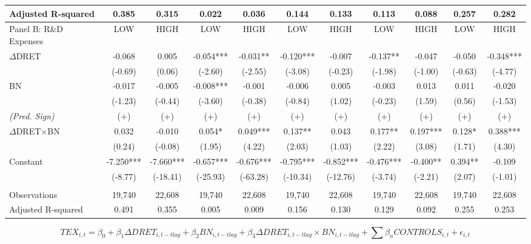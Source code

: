 \begin{table}[H]
\begin{center}
\begin{tabular}{lcccccccccc}
			Adjusted R-squared & 0.385 & 0.315 & 0.022 & 0.036 & 0.144 & 0.133 & 0.113 & 0.088 & 0.257 & 0.282 \\
			\midrule
			Panel B: R\&D Expenses & LOW & HIGH & LOW & HIGH & LOW & HIGH & LOW & HIGH & LOW & HIGH\\
			\midrule
			$\Delta$DRET & -0.068 & 0.005 & -0.054*** & -0.031** & -0.120*** & -0.007 & -0.137** & -0.047 & -0.050 & -0.348*** \\
			& (-0.69) & (0.06) & (-2.60) & (-2.55) & (-3.08) & (-0.23) & (-1.98) & (-1.00) & (-0.63) & (-4.77) \\
			BN & -0.017 & -0.005 & -0.008*** & -0.001 & -0.006 & 0.005 & -0.003 & 0.013 & 0.011 & -0.020 \\
			& (-1.23) & (-0.44) & (-3.60) & (-0.38) & (-0.84) & (1.02) & (-0.23) & (1.59) & (0.56) & (-1.53) \\
			\rowcolor[rgb]{ .906,  .902,  .902} \textit{(Pred. Sign)} & (+) & (+) & (+) & (+) & (+) & (+) & (+) & (+) & (+) & (+) \\
			\rowcolor[rgb]{ .906,  .902,  .902} $\Delta$DRET$\times$BN & 0.032 & -0.010 & 0.054* & 0.049*** & 0.137** & 0.043 & 0.177** & 0.197*** & 0.128* & 0.388*** \\
			\rowcolor[rgb]{ .906,  .902,  .902} & (0.24) & (-0.08) & (1.95) & (4.22) & (2.03) & (1.03) & (2.22) & (3.08) & (1.71) & (4.30) \\
			Constant & -7.250*** & -7.660*** & -0.657*** & -0.676*** & -0.795*** & -0.852*** & -0.476*** & -0.400** & 0.394** & -0.109 \\
			& (-8.77) & (-18.41) & (-25.93) & (-63.28) & (-10.34) & (-12.76) & (-3.74) & (-2.21) & (2.07) & (-1.01) \\
			&   &   &   &   &   &   &   &   &   &  \\
			Observations & 19,740 & 22,608 & 19,740 & 22,608 & 19,740 & 22,608 & 19,740 & 22,608 & 19,740 & 22,608 \\
			Adjusted R-squared & 0.491 & 0.355 & 0.005 & 0.009 & 0.156 & 0.130 & 0.129 & 0.092 & 0.255 & 0.253 \\
			\bottomrule
			\bottomrule
		\end{tabular}%
	\end{center}
		\begin{footnotesize}
			\setcounter{equation}{0}
			\begin{equation}
				TEX_{i,t}=\beta_0+\beta_1\Delta DRET_{i,t-tlag}+\beta_2BN_{i,t-tlag}+\beta_3\Delta DRET_{i,t-tlag}\times 	BN_{i,t-tlag}+\sum\beta_nCONTROLS_{i,t}+\epsilon_{i,t}
			\end{equation}
			

\end{footnotesize}
\end{table}
